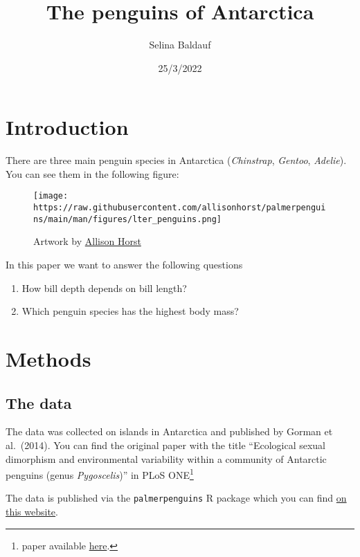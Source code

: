\documentclass[
]{article}
\title{The penguins of Antarctica}
\author{Selina Baldauf}
\date{25/3/2022}
\providecommand{\tightlist}{%
  \setlength{\itemsep}{0pt}\setlength{\parskip}{0pt}}
\begin{document}
\maketitle

\hypertarget{introduction}{%
\section{Introduction}\label{introduction}}

There are three main penguin species in Antarctica (\emph{Chinstrap},
\emph{Gentoo}, \emph{Adelie}). You can see them in the following figure:

\begin{figure}
\centering
\texttt{[image: https://raw.githubusercontent.com/allisonhorst/palmerpenguins/main/man/figures/lter\_penguins.png]}
\caption{Artwork by \href{https://twitter.com/allison_horst}{Allison
Horst}}
\end{figure}

In this paper we want to answer the following questions

\begin{enumerate}
\def\labelenumi{\arabic{enumi}.}
\tightlist
\item
  How bill depth depends on bill length?
\item
  Which penguin species has the highest body mass?
\end{enumerate}

\hypertarget{methods}{%
\section{Methods}\label{methods}}

\hypertarget{the-data}{%
\subsection{The data}\label{the-data}}

The data was collected on islands in Antarctica and published by Gorman
et al.~(2014). You can find the original paper with the title
``Ecological sexual dimorphism and environmental variability within a
community of Antarctic penguins (genus \emph{Pygoscelis})'' in PLoS
ONE\footnote{paper available
  \href{https://doi.org/10.1371/journal.pone.0090081}{here}.}

The data is published via the \texttt{palmerpenguins} R package which
you can find \href{https://allisonhorst.github.io/palmerpenguins/}{on
this website}.
\end{document}

